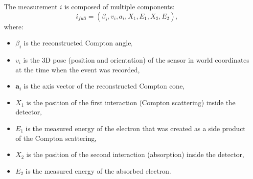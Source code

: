 The measurement $i$ is composed of multiple components:
\begin{equation}
  i_{full} = (\beta_{i}, v_{i}, a_{i}, X_{1}, E_{1}, X_{2}, E_{2}),
\end{equation}
where:
\begin{itemize}
  \item $\beta_{i}$ is the reconstructed Compton angle,
  \item $v_{i}$ is the 3D pose (position and orientation) of the sensor in world coordinates at the time when the event was recorded,
  \item $\mathbf{a}_{i}$ is the axis vector of the reconstructed Compton cone,
  \item $X_{1}$ is the position of the first interaction (Compton scattering) inside the detector,
  \item $E_{1}$ is the measured energy of the electron that was created as a side product of the Compton scattering,
  \item $X_{2}$ is the position of the second interaction (absorption) inside the detector,
  \item $E_{2}$ is the measured energy of the absorbed electron.
\end{itemize}

